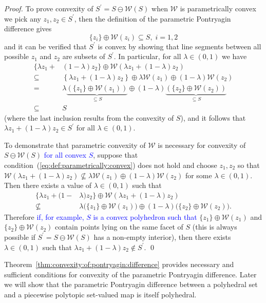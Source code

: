\documentclass[smallextended]{svjour3}       %
\numberwithin{equation}{section}
\newcommand{\revision}[1]{\textcolor{blue}{#1}}
\begin{document}
\begin{proof}
To prove convexity of $S^\prime =  S\ominus \mathcal W( S)$ when $\mathcal W$ is parametrically convex we pick any $z_1,z_2\in S^\prime$, then
the definition of the parametric Pontryagin difference gives
\begin{equation}
  \{z_i\} \oplus \mathcal W(z_i) \subseteq S,\; i=1,2 
\end{equation}
%
and it can be verified that $S^\prime$ is convex by showing that line segments between all possible $z_1$ and $z_2$ are subsets of $S^\prime$. In particular, for all $\lambda \in (0,1)$ we have
\begin{align*}
  \{ \lambda z_1 + &(1-\lambda)z_2
  \}\oplus \mathcal W\left( \lambda z_1 + (1-\lambda)z_2\right)\\
  \subseteq&\left\{ \lambda z_1 + (1-\lambda)z_2
  \right\}\oplus \lambda \mathcal W(z_1) \oplus (1-\lambda)
  \mathcal W(z_2)\\
 = &\lambda\underbrace{(\{z_1\}\oplus \mathcal W(z_1))}_{\subseteq S}\oplus
  (1-\lambda)\underbrace{(\{z_2\}\oplus \mathcal W(z_2))}_{\subseteq S}\\
  \subseteq& S
\end{align*}
%
(where the last inclusion results from the convexity of $S$), and it follows that
$\lambda z_1 + (1-\lambda) z_2 \in S^\prime$ for all $\lambda \in (0,1)$. 
%

To demonstrate that parametric convexity of $\mathcal W$ is necessary for convexity of $S\ominus \mathcal W(S)$ \revision{for all convex $S$}, suppose that condition~(\ref{eq:def:parametrically:convex}) does not hold and choose $z_1,z_2$ so that $\mathcal W(\lambda z_1 + (1-\lambda) z_2) \not\subseteq \lambda \mathcal W(z_1) \oplus (1-\lambda) \mathcal W (z_2)$ for some $\lambda \in (0,1)$. Then there exists a value of $\lambda\in(0,1)$ such that
\begin{align*}
  \{ \lambda z_1 + (1-&\lambda)z_2
  \}\oplus \mathcal W\left( \lambda z_1 + (1-\lambda)z_2\right)\\
 \not\subseteq &\lambda\bigl(\{z_1\}\oplus \mathcal W(z_1)\bigr)\oplus
  (1-\lambda)\bigl(\{z_2\}\oplus \mathcal W(z_2)\bigr) .
\end{align*}
Therefore \revision{if, for example, $S$ is a convex polyhedron such that} $\{z_1\}\oplus\mathcal W(z_1)$ and $\{z_2\}\oplus\mathcal W(z_2)$ contain points lying on the same facet of $S$ (this is always possible if $S^\prime=S\ominus \mathcal W(S)$ has a non-empty interior), then there exists $\lambda \in (0,1)$ such that $\lambda z_1 + (1-\lambda) z_2 \notin S^\prime$.
\qed
\end{proof}
%
Theorem~\ref{thm:convexity:of:pontryagin:difference} provides necessary and sufficient conditions for convexity of the parametric Pontryagin difference. 
%
Later we will show that the parametric Pontryagin difference between a polyhedral set and a piecewise polytopic set-valued map is itself polyhedral.
%
%
%
%
\end{document}

